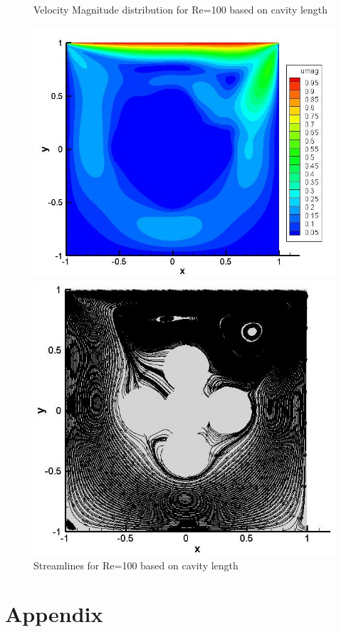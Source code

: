 \documentclass[12pt]{elsarticle}
\begin{document}
	\begin{figure}[h]
		\caption{Velocity Magnitude distribution for Re=100 based on cavity length}
		\centering\includegraphics[width=0.7\linewidth]{59_immerssed_boundary_velocity}
		\caption{Streamlines for Re=100 based on cavity length}
		\centering\includegraphics[width=0.7\linewidth]{59_immerssed_boundary_streamlines}
	\end{figure}
	\clearpage
	
	\section{Appendix}
	\label{S:2}
	
	
	
	
	
\end{document}
